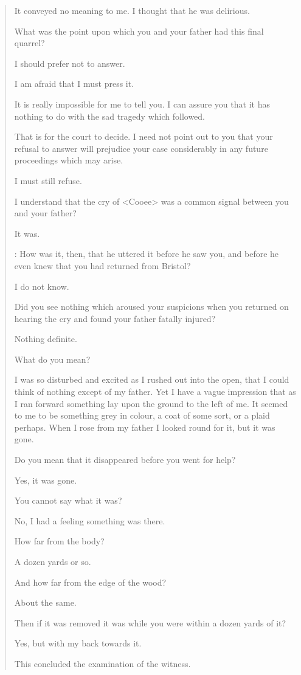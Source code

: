 \begin{quotation}
\begin{dialogue}
 It conveyed no meaning to me. I thought that he was delirious.

 What was the point upon which you and your father had this final quarrel?

 I should prefer not to answer.

 I am afraid that I must press it.

 It is really impossible for me to tell you. I can assure you that it has nothing to do with the sad tragedy which followed.

 That is for the court to decide. I need not point out to you that your refusal to answer will prejudice your case considerably in any future proceedings which may arise.

 I must still refuse.

 I understand that the cry of <Cooee> was a common signal between you and your father?

 It was.

: How was it, then, that he uttered it before he saw you, and before he even knew that you had returned from Bristol?

  I do not know.

 Did you see nothing which aroused your suspicions when you returned on hearing the cry and found your father fatally injured?

 Nothing definite.

 What do you mean?

 I was so disturbed and excited as I rushed out into the open, that I could think of nothing except of my father. Yet I have a vague impression that as I ran forward something lay upon the ground to the left of me. It seemed to me to be something grey in colour, a coat of some sort, or a plaid perhaps. When I rose from my father I looked round for it, but it was gone.

 Do you mean that it disappeared before you went for help?

 Yes, it was gone.

 You cannot say what it was?

 No, I had a feeling something was there.

 How far from the body?

 A dozen yards or so.

 And how far from the edge of the wood?

 About the same.

 Then if it was removed it was while you were within a dozen yards of it?

 Yes, but with my back towards it.
\end{dialogue}
This concluded the examination of the witness.

\end{quotation}

